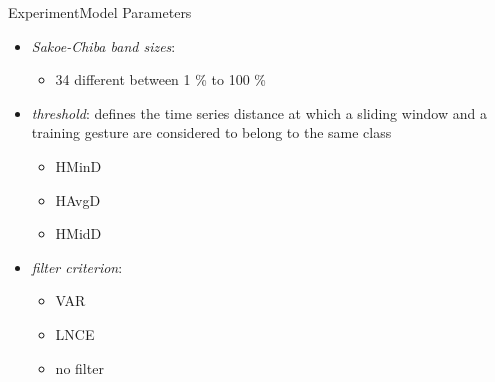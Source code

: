 \begin{frame}{Experiment}{Model Parameters}
    \begin{itemize}
        \item \textit{Sakoe-Chiba band sizes}:
            \begin{itemize}
                \item 34 different between 1 \% to 100 \%
            \end{itemize}
        \item \textit{threshold}: defines the time series distance at which a sliding window and a training gesture are considered to belong to the same class
            \begin{itemize}
                \item HMinD
                \item HAvgD
                \item HMidD
            \end{itemize}
        \item \textit{filter criterion}:
            \begin{itemize}
                \item VAR
                \item LNCE
                \item no filter
            \end{itemize}
    \end{itemize}
\end{frame}

